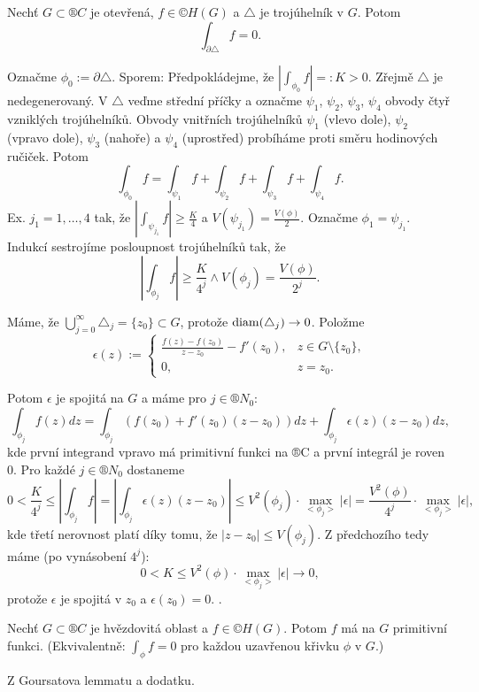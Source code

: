 \documentclass[12pt]{article}					%
\begin{document}
\begin{veta}
	Nechť $G \subset ®C$ je otevřená, $f \in ©H(G)$ a $\triangle$ je trojúhelník v $G$. Potom
	$$ \int_{\partial \triangle} f = 0. $$

	\begin{dukazin}
		Označme $\phi_0 := \partial \triangle$. Sporem: Předpokládejme, že $|\int_{\phi_0} f| =: K > 0$. Zřejmě $\triangle$ je nedegenerovaný. V $\triangle$ veďme střední příčky a označme $\psi_1$, $\psi_2$, $\psi_3$, $\psi_4$ obvody čtyř vzniklých trojúhelníků. Obvody vnitřních trojúhelníků $\psi_1$ (vlevo dole), $\psi_2$ (vpravo dole), $\psi_3$ (nahoře) a $\psi_4$ (uprostřed) probíháme proti směru hodinových ručiček. Potom
		$$ \int_{\phi_0} f = \int_{\psi_1} f + \int_{\psi_2} f + \int_{\psi_3} f + \int_{\psi_4} f. $$
		Ex. $j_1 = 1, …, 4$ tak, že $|\int_{\psi_{j_1}} f| ≥ \frac{K}{4}$ a $V(\psi_{j_1}) = \frac{V(\phi)}{2}$. Označme $\phi_1 = \psi_{j_1}$. Indukcí sestrojíme posloupnost trojúhelníků tak, že
		$$ \left|\int_{\phi_j} f\right| ≥ \frac{K}{4^j} \land V(\phi_j) = \frac{V(\phi)}{2^j}. $$

		Máme, že $\bigcup_{j=0}^∞ \triangle_j = \{z_0\} \subset G$, protože $\operatorname{diam}(\triangle_j) \rightarrow 0$. Položme
		$$ \epsilon(z) := \begin{cases}\frac{f(z) - f(z_0)}{z - z_0} - f'(z_0), & z \in G\setminus \{z_0\},\\ 0, & z = z_0.\end{cases} $$

		Potom $\epsilon$ je spojitá na $G$ a máme pro $j \in ®N_0$:
		$$ \int_{\phi_j} f(z) dz = \int_{\phi_j} (f(z_0) + f'(z_0)(z - z_0))dz + \int_{\phi_j}\epsilon(z)(z - z_0) dz, $$
		kde první integrand vpravo má primitivní funkci na ®C a první integrál je roven 0. Pro každé $j \in ®N_0$ dostaneme
		$$ 0 < \frac{K}{4^j} ≤ \left|\int_{\phi_j} f\right| = \left|\int_{\phi_j} \epsilon(z)(z - z_0)\right| ≤ V^2(\phi_j)·\max_{<\phi_j>} |\epsilon| = \frac{V^2(\phi)}{4^j}·\max_{<\phi_j>}|\epsilon|, $$
		kde třetí nerovnost platí díky tomu, že $|z - z_0| ≤ V(\phi_j)$. Z předchozího tedy máme (po vynásobení $4^j$):
		$$ 0 < K ≤ V^2(\phi)·\max_{<\phi_j>}|\epsilon| \rightarrow 0, $$
		protože $\epsilon$ je spojitá v $z_0$ a $\epsilon(z_0) = 0$. \lightning.
	\end{dukazin}
\end{veta}

\begin{veta}
	Nechť $G \subset ®C$ je hvězdovitá oblast a $f \in ©H(G)$. Potom $f$ má na $G$ primitivní funkci. (Ekvivalentně: $\int_{\phi} f = 0$ pro každou uzavřenou křivku $\phi$ v $G$.)

	\begin{dukazin}
		Z Goursatova lemmatu a dodatku.
	\end{dukazin}
\end{veta}
\end{document}
